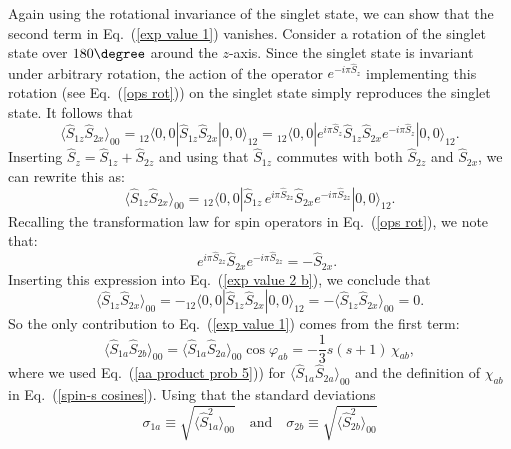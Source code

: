Again using the rotational invariance of the singlet state, we can show that the second term in Eq.\ (\ref{exp value 1}) vanishes. Consider a rotation of the singlet state over $180\degree$ around the $z$-axis. Since the singlet state is invariant under arbitrary rotation, the action of the operator $e^{-i\pi \hat{S}_z}$ implementing this rotation (see Eq.\ (\ref{ops rot})) on the singlet state simply reproduces the singlet state. It follows that
\begin{equation}
\langle \hat{S}_{1z}\hat{S}_{2x}\rangle_{00} = {_{12\!}}\langle 0,0| \hat{S}_{1z}\hat{S}_{2x}|0,0\rangle_{\!12} =  {_{12\!}}\langle 0,0|e^{i\pi \hat{S}_z} \hat{S}_{1z}\hat{S}_{2x}e^{-i\pi \hat{S}_z}|0,0\rangle_{\!12}.
\label{exp value 2 a}
\end{equation}
Inserting $\hat{S}_z = \hat{S}_{1z} + \hat{S}_{2z}$ and using that $\hat{S}_{1z}$ commutes with both $\hat{S}_{2z}$ and $\hat{S}_{2x}$, we can rewrite this as:
\begin{equation}
\langle \hat{S}_{1z}\hat{S}_{2x}\rangle_{00} = {_{12\!}}\langle 0,0| \hat{S}_{1z} \, e^{i\pi \hat{S}_{2z}}\hat{S}_{2x}e^{-i\pi \hat{S}_{2z}} |0,0\rangle_{\!12}.
\label{exp value 2 b}
\end{equation}
Recalling the transformation law for spin operators in Eq.\ (\ref{ops rot}), we note that:
\begin{equation}
\quad e^{i\pi \hat{S}_{2z}}\hat{S}_{2x}e^{-i\pi \hat{S}_{2z}} = -\hat{S}_{2x}.
\label{exp value 2 c}
\end{equation}
Inserting this expression into Eq.\ (\ref{exp value 2 b}), we conclude that
\begin{equation}
\langle \hat{S}_{1z}\hat{S}_{2x}\rangle_{00} = - {_{12\!}}\langle 0,0|  \hat{S}_{1z}\hat{S}_{2x} |0,0\rangle_{\!12} =  - \langle \hat{S}_{1z}\hat{S}_{2x} \rangle_{00} = 0.
\label{exp value 2 d}
\end{equation}
So the only contribution to Eq.\ (\ref{exp value 1}) comes from the first term: 
\begin{equation}
\langle \hat{S}_{1a}\hat{S}_{2b}\rangle_{00} = \langle \hat{S}_{1a}\hat{S}_{2a} \rangle_{00} \cos\varphi_{ab} = -\frac13 s(s+1) \, \chi_{ab},
\label{exp value 3}
\end{equation} 
where we used Eq.\  (\ref{aa product prob 5})) for $ \langle \hat{S}_{1a}\hat{S}_{2a} \rangle_{00}$ and the definition of $\chi_{ab}$ in Eq.\ (\ref{spin-s cosines}). Using that the standard deviations 
\begin{equation}
\sigma_{1a} \equiv \sqrt{\langle \hat{S}_{1a}^2 \rangle_{00} } \quad {\mathrm{and}} \quad
\sigma_{2b} \equiv \sqrt{ \langle \hat{S}_{2b}^2 \rangle_{00} }
\label{sigma s > 1/2 a} 
\end{equation}
